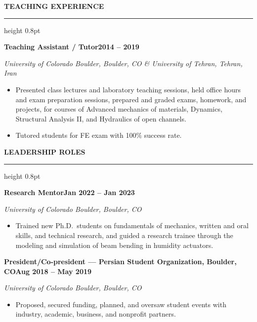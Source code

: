 \documentclass[10pt, letterpaper]{article}
\newcommand{\rsection}[1]{%
  \vspace{8pt}%
  {\large\bfseries\MakeUppercase{#1}}%
  \vspace{1pt}%
  \hrule height 0.8pt%
  \vspace{4pt}%
}
\newcommand{\jobline}[2]{%
  \vspace{5pt}%
  \noindent\textbf{#1}\hfill\textbf{#2}\par%
  \vspace{1pt}%
}
\newcommand{\subline}[1]{%
  \vspace{-1pt}%
  \noindent\textit{#1}\par%
  \vspace{1pt}%
}
\newenvironment{rlist}{%
  \begin{itemize}[leftmargin=1.4em, itemsep=1pt, topsep=2pt, parsep=0pt]%
}{%
  \end{itemize}%
}
\begin{document}
\rsection{Teaching Experience}

\jobline{Teaching Assistant / Tutor}{2014 -- 2019}
\subline{University of Colorado Boulder, Boulder, CO \& University of Tehran, Tehran, Iran}
\begin{rlist}
  \item Presented class lectures and laboratory teaching sessions, held office hours and exam preparation sessions, prepared and graded exams, homework, and projects, for courses of Advanced mechanics of materials, Dynamics, Structural Analysis II, and Hydraulics of open channels.
  \item Tutored students for FE exam with 100\% success rate.
\end{rlist}

\rsection{Leadership Roles}

\jobline{Research Mentor}{Jan 2022 -- Jan 2023}
\subline{University of Colorado Boulder, Boulder, CO}
\begin{rlist}
  \item Trained new Ph.D.\ students on fundamentals of mechanics, written and oral skills, and technical research, and guided a research trainee through the modeling and simulation of beam bending in humidity actuators.
\end{rlist}

\jobline{President/Co-president --- Persian Student Organization, Boulder, CO}{Aug 2018 -- May 2019}
\subline{University of Colorado Boulder, Boulder, CO}
\begin{rlist}
  \item Proposed, secured funding, planned, and oversaw student events with industry, academic, business, and nonprofit partners.
\end{rlist}
\end{document}
